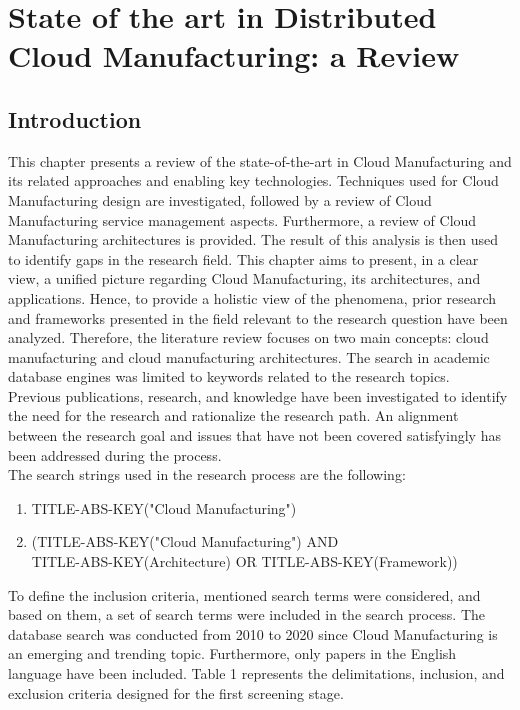 \chapter{State of the art in Distributed Cloud Manufacturing: a Review}
\section{Introduction}
This chapter presents a review of the state-of-the-art in Cloud Manufacturing and its related approaches and enabling key technologies. Techniques used for Cloud Manufacturing design are investigated, followed by a review of Cloud Manufacturing service management aspects. Furthermore, a review of Cloud Manufacturing architectures is provided. The result of this analysis is then used to identify gaps in the research field. This chapter aims to present, in a clear view, a unified picture regarding Cloud Manufacturing, its architectures, and applications. Hence, to provide a holistic view of the phenomena, prior research and frameworks presented in the field relevant to the research question have been analyzed. Therefore, the literature review focuses on two main concepts: cloud manufacturing and cloud manufacturing architectures. The search in academic database engines was limited to keywords related to the research topics.\\
Previous publications, research, and knowledge have been investigated to identify the need for the research and rationalize the research path. An alignment between the research goal and issues that have not been covered satisfyingly has been addressed during the process.\\
The search strings used in the research process are the following:
\begin{enumerate}
    \item TITLE-ABS-KEY("Cloud Manufacturing")
    \item (TITLE-ABS-KEY("Cloud Manufacturing") AND \\ TITLE-ABS-KEY(Architecture) OR TITLE-ABS-KEY(Framework))
\end{enumerate}
To define the inclusion criteria, mentioned search terms were considered, and based on them, a set of search terms were included in the search process. The database search was conducted from 2010 to 2020 since Cloud Manufacturing is an emerging and trending topic. Furthermore, only papers in the English language have been included. Table 1 represents the delimitations, inclusion, and exclusion criteria designed for the first screening stage.\\
